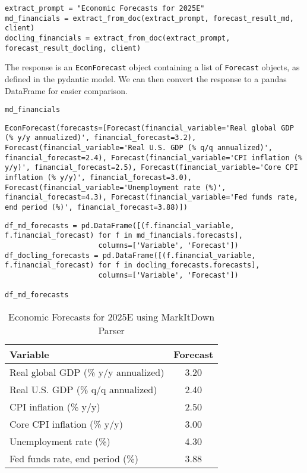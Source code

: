 \begin{verbatim}
extract_prompt = "Economic Forecasts for 2025E"
md_financials = extract_from_doc(extract_prompt, forecast_result_md, client)
docling_financials = extract_from_doc(extract_prompt, forecast_result_docling, client)
\end{verbatim}
The response is an \texttt{EconForecast} object containing a list of \texttt{Forecast} objects, as defined in the pydantic model. We can then convert the response to a pandas DataFrame for easier comparison.

\begin{verbatim}
md_financials
\end{verbatim}


\begin{verbatim}
EconForecast(forecasts=[Forecast(financial_variable='Real global GDP (% y/y annualized)', financial_forecast=3.2), Forecast(financial_variable='Real U.S. GDP (% q/q annualized)', financial_forecast=2.4), Forecast(financial_variable='CPI inflation (% y/y)', financial_forecast=2.5), Forecast(financial_variable='Core CPI inflation (% y/y)', financial_forecast=3.0), Forecast(financial_variable='Unemployment rate (%)', financial_forecast=4.3), Forecast(financial_variable='Fed funds rate, end period (%)', financial_forecast=3.88)])
\end{verbatim}


\begin{verbatim}
df_md_forecasts = pd.DataFrame([(f.financial_variable, f.financial_forecast) for f in md_financials.forecasts], 
                      columns=['Variable', 'Forecast'])
df_docling_forecasts = pd.DataFrame([(f.financial_variable, f.financial_forecast) for f in docling_forecasts.forecasts], 
                      columns=['Variable', 'Forecast'])

df_md_forecasts
\end{verbatim}



\begin{table}[h!]
\centering
\caption{Economic Forecasts for 2025E using MarkItDown Parser}
\begin{tabular}{lc}
\hline
\textbf{Variable} & \textbf{Forecast} \\
\hline
Real global GDP (\% y/y annualized) & 3.20 \\
Real U.S. GDP (\% q/q annualized) & 2.40 \\
CPI inflation (\% y/y) & 2.50 \\
Core CPI inflation (\% y/y) & 3.00 \\
Unemployment rate (\%) & 4.30 \\
Fed funds rate, end period (\%) & 3.88 \\
\hline
\end{tabular}
\label{tab:markitdown-forecasts}
\end{table}


